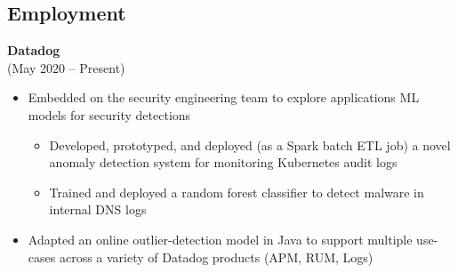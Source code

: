 \documentclass{res}
\begin{document}
 
\setlength{\parskip}{10pt}
\renewcommand{\labelitemi}{\scriptsize$\bullet$} 

\address{\hspace{2pt}} %
\address{\href{http://maxlivingston.org}{maxlivingston.org}}

\begin{resume}
  \setlength{\sectionskip}{0pt}
  \section{Employment}
  \setlength{\sectionskip}{5pt}
  \vspace{2pt}
    {\bf Datadog} \\ 
     \hspace{3pt} (May 2020 -- Present)
    \vspace{2pt}
  \begin{itemize} \itemsep 2.0pt \parskip 2.0pt %
  \item Embedded on the security engineering team to explore applications ML models for security detections
    \setlength{\parskip}{-2pt} 
    \begin{itemize}
      \setlength{\itemsep}{1.0pt}
    \item Developed, prototyped, and deployed (as a Spark batch ETL job) a novel anomaly detection system for monitoring Kubernetes audit logs
    \item Trained and deployed a random forest classifier to detect malware in internal DNS logs
    \end{itemize}
    \setlength{\parskip}{2.0pt} 
      
  \item Adapted an online outlier-detection model in Java to support multiple use-cases across a variety of Datadog products (APM, RUM, Logs)

  \end{itemize}
  

\end{resume}
\end{document}

